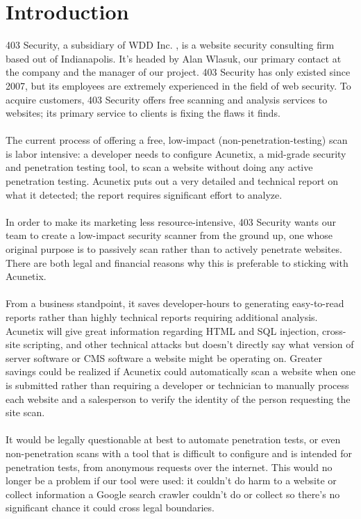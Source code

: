 \section{Introduction}
	403 Security, a subsidiary of WDD Inc. , is a website security consulting firm based out of Indianapolis.  It’s headed by Alan Wlasuk, our primary contact at the company and the manager of our project. 403 Security has only existed  since 2007, but its employees are extremely experienced in the field of web security. To acquire customers, 403 Security offers free scanning and analysis services to websites; its primary service to clients is fixing the flaws it finds.\\\\
The current process of offering a free, low-impact (non-penetration-testing) scan is labor intensive: a developer needs to configure Acunetix, a mid-grade security and penetration testing tool, to scan a website without doing any active penetration testing. Acunetix puts out a very detailed and technical report on what it detected; the report requires significant effort to analyze.\\\\
In order to make its marketing less resource-intensive, 403 Security wants our team to create a low-impact security scanner from the ground up, one whose original purpose is to passively scan rather than to actively penetrate websites. There are both legal and financial reasons why this is preferable to sticking with Acunetix.\\\\
From a business standpoint, it saves developer-hours to  generating easy-to-read reports rather than highly technical reports requiring additional analysis. Acunetix will give great information regarding HTML and SQL injection, cross-site scripting, and other technical attacks but doesn’t directly say what version of server software or CMS software a website might be operating on. Greater savings could be realized if Acunetix could automatically scan a website when one is submitted rather than requiring a developer or technician to manually process each website and a salesperson to verify the identity of the person requesting the site scan.\\\\
 It would be legally questionable at best to automate penetration tests, or even non-penetration scans with a tool that is difficult to configure and is intended for penetration tests, from anonymous requests over the internet. This would no longer be a problem if our tool were used: it couldn’t do harm to a website or collect information a Google search crawler couldn’t do or collect so there’s no significant chance it could cross legal boundaries.\\\\
